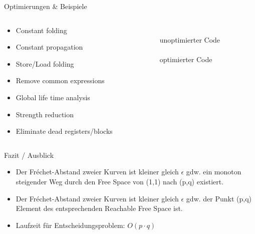 \documentclass[ucs,9pt]{beamer}
\begin{document}
\begin{frame}{Optimierungen \& Beispiele}

\begin{columns}
\begin{column}{.48\textwidth}

\begin{itemize}
\item <+-| alert@+> Constant folding
\item <+-| alert@+> Constant propagation
\item <+-| alert@+> Store/Load folding
\item <+-| alert@+> Remove common expressions
\item <+-| alert@+> Global life time analysis
\item <+-| alert@+> Strength reduction
\item <+-| alert@+> Eliminate dead registers/blocks
\end{itemize}

\end{column}%
\begin{column}{.48\textwidth}

{\\
{\color{red}unoptimierter Code}\\
\vspace*{0.3cm}
\\
{\color{green}optimierter Code}}

\end{column}%
\end{columns}

\end{frame}

\begin{frame}{Fazit / Ausblick}
\begin{itemize}
\item Der Fréchet-Abstand zweier Kurven ist kleiner gleich $\epsilon$ gdw. ein monoton steigender Weg durch den Free Space von (1,1) nach (p,q) existiert.
\vspace{3mm}
\item Der Fréchet-Abstand zweier Kurven ist kleiner gleich $\epsilon$ gdw. der Punkt (p,q) Element des entsprechenden Reachable Free Space ist.
\vspace{3mm}
\item Laufzeit für Entscheidungsproblem: $O(p\cdot q)$
\end{itemize}
\end{frame}
\end{document}
